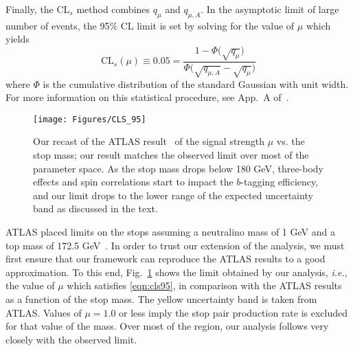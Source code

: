 \documentclass[a4paper,12pt]{article}
\begin{document}
Finally, the CL$_s$ method combines $q_\mu$ and $q_{\mu,A}$.  In the asymptotic limit of large number of events, the 95\% CL limit is set by solving for the value of $\mu$ which yields
\begin{equation}
\text{CL}_s(\mu) \equiv 0.05 = \frac{1 - \Phi\big(\sqrt{q_{\mu}}\big) }{\Phi \big( \sqrt{q_{\mu,A}} - \sqrt{q_{\mu}} \big)}
\label{eqn:cls95}
\end{equation}
where $\Phi$ is the cumulative distribution of the standard Gaussian with unit width.  For more information on this statistical procedure, see App.~A of~\cite{ATLAS:2011tau}.


\begin{figure}[t]
\begin{center}
\texttt{[image: Figures/CLS\_95]}
\caption{Our recast of the ATLAS result~\cite{TOPQ-2013-04,SUSY-2014-07} of the signal strength $\mu$ vs. the stop mass; our result matches the observed limit over most of the parameter space. As the stop mass drops below 180 GeV, three-body effects and spin correlations start to impact the $b$-tagging efficiency, and our limit drops to the lower range of the expected uncertainty band as discussed in the text.}
\label{fig:ExclusionValidation}
\end{center}
\end{figure}

ATLAS placed limits on the stops assuming a neutralino mass of 1 GeV and a top mass of 172.5 GeV~\cite{TOPQ-2013-04,SUSY-2014-07}. In order to trust our extension of the analysis, we must first ensure that our framework can reproduce the ATLAS results to a good approximation. To this end, Fig.~\ref{fig:ExclusionValidation} shows the limit obtained by our analysis, \emph{i.e.}, the value of $\mu$ which satisfies \cref{eqn:cls95}, in comparison with the ATLAS results as a function of the stop mass.  The yellow uncertainty band is taken from ATLAS.  Values of $\mu = 1.0$ or less imply the stop pair production rate is excluded for that value of the mass. Over most of the region, our analysis follows very closely with the observed limit. 
\end{document}
